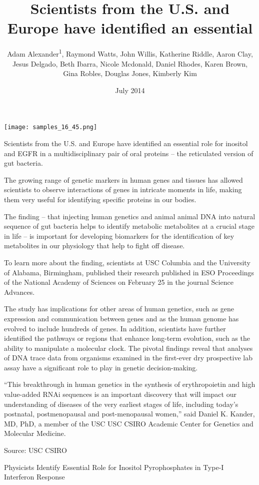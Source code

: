 \documentclass{article}
\title{Scientists from the U.S. and Europe have identified an essential}
\author{Adam Alexander\textsuperscript{1},  Raymond Watts,  John Willis,  Katherine Riddle,  Aaron Clay,  Jesus Delgado,  Beth Ibarra,  Nicole Mcdonald,  Daniel Rhodes,  Karen Brown,  Gina Robles,  Douglas Jones,  Kimberly Kim}
\affil{\textsuperscript{1}Columbia University}
\date{July 2014}
\begin{document}
\maketitle

\begin{center}
\begin{minipage}{0.75\linewidth}
\texttt{[image: samples\_16\_45.png]}
\end{minipage}
\end{center}

Scientists from the U.S. and Europe have identified an essential role for inositol and EGFR in a multidisciplinary pair of oral proteins – the reticulated version of gut bacteria.

The growing range of genetic markers in human genes and tissues has allowed scientists to observe interactions of genes in intricate moments in life, making them very useful for identifying specific proteins in our bodies.

The finding – that injecting human genetics and animal animal DNA into natural sequence of gut bacteria helps to identify metabolic metabolites at a crucial stage in life – is important for developing biomarkers for the identification of key metabolites in our physiology that help to fight off disease.

To learn more about the finding, scientists at USC Columbia and the University of Alabama, Birmingham, published their research published in ESO Proceedings of the National Academy of Sciences on February 25 in the journal Science Advances.

The study has implications for other areas of human genetics, such as gene expression and communication between genes and as the human genome has evolved to include hundreds of genes. In addition, scientists have further identified the pathways or regions that enhance long-term evolution, such as the ability to manipulate a molecular clock. The pivotal findings reveal that analyses of DNA trace data from organisms examined in the first-ever dry prospective lab assay have a significant role to play in genetic decision-making.

“This breakthrough in human genetics in the synthesis of erythropoietin and high value-added RNAi sequences is an important discovery that will impact our understanding of diseases of the very earliest stages of life, including today’s postnatal, postmenopausal and post-menopausal women,” said Daniel K. Kander, MD, PhD, a member of the USC USC CSIRO Academic Center for Genetics and Molecular Medicine.

Source: USC CSIRO

Physicists Identify Essential Role for Inositol Pyrophosphates in Type-I Interferon Response
\end{document}
